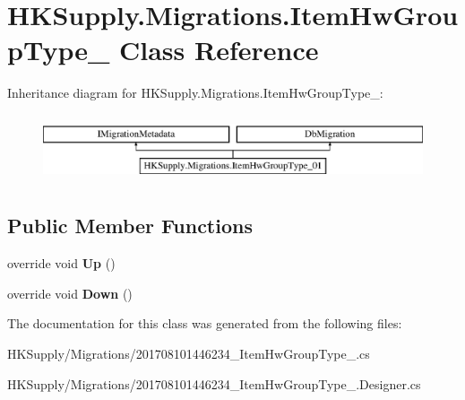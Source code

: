 \hypertarget{class_h_k_supply_1_1_migrations_1_1_item_hw_group_type__01}{}\section{H\+K\+Supply.\+Migrations.\+Item\+Hw\+Group\+Type\+\_ Class Reference}
\label{class_h_k_supply_1_1_migrations_1_1_item_hw_group_type__01}
Inheritance diagram for H\+K\+Supply.\+Migrations.\+Item\+Hw\+Group\+Type\+\_\+:\begin{figure}[H]
\begin{center}
\leavevmode
\includegraphics[height=2.000000cm]{class_h_k_supply_1_1_migrations_1_1_item_hw_group_type__01}
\end{center}
\end{figure}
\subsection*{Public Member Functions}
\begin{DoxyCompactItemize}
\item 
\mbox{\label{class_h_k_supply_1_1_migrations_1_1_item_hw_group_type__01_a915f7286317e6a80ca72e9ffc6306a43}} 
override void {\bfseries Up} ()
\item 
\mbox{\label{class_h_k_supply_1_1_migrations_1_1_item_hw_group_type__01_a85c6f40e963e3cabbe9516c5858537f8}} 
override void {\bfseries Down} ()
\end{DoxyCompactItemize}


The documentation for this class was generated from the following files\+:\begin{DoxyCompactItemize}
\item 
H\+K\+Supply/\+Migrations/201708101446234\+\_\+\+Item\+Hw\+Group\+Type\+\_.\+cs\item 
H\+K\+Supply/\+Migrations/201708101446234\+\_\+\+Item\+Hw\+Group\+Type\+\_.\+Designer.\+cs\end{DoxyCompactItemize}
